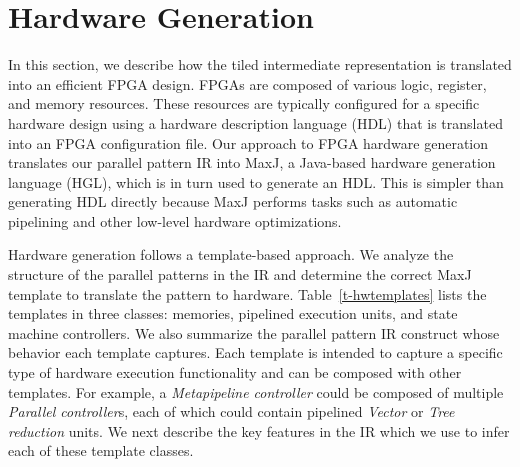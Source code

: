 \documentclass[pageno]{jpaper}
\begin{document}
 \section{Hardware Generation}
\label{hardware}
In this section, we describe how the tiled intermediate representation is translated into an efficient FPGA design.
FPGAs are composed of various logic, register, and memory resources.
These resources are typically configured for a specific hardware design using a hardware description language (HDL) that is translated into an FPGA configuration file.
Our approach to FPGA hardware generation translates our parallel pattern IR into MaxJ, a Java-based hardware generation language (HGL), which is in turn used to generate an HDL.
This is simpler than generating HDL directly because MaxJ performs tasks such as automatic pipelining and other low-level hardware optimizations.







Hardware generation follows a template-based approach. We analyze the structure of the parallel
patterns in the IR and determine the correct MaxJ template to translate the pattern
to hardware. Table~\ref{t-hwtemplates} lists the templates in three classes: memories, pipelined execution units,
and state machine controllers. We also summarize the parallel pattern IR construct whose behavior each template captures. Each template is intended
to capture a specific type of hardware execution functionality and can be composed with other templates. For example,
a \emph{Metapipeline controller} could be composed of multiple \emph{Parallel controller}s, each of which could
contain pipelined \emph{Vector} or \emph{Tree reduction} units.
We next describe the key features in the IR which we use to infer each of these template classes.
\end{document}
